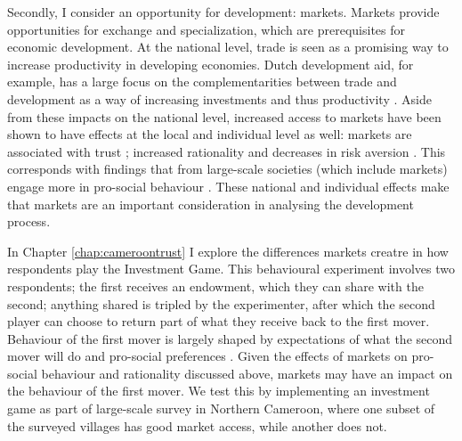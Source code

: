 Secondly, I consider an opportunity for development: markets. Markets provide opportunities for exchange and specialization, which are prerequisites for economic development. At the national level, trade is seen as a promising way to increase productivity in developing economies. Dutch development aid, for example, has a large focus on the complementarities between trade and development as a way of increasing investments and thus productivity \citep[see e.g.][]{Zoomers2014}. Aside from these impacts on the national level, increased access to markets have been shown to have effects at the local and individual level as well: markets are associated with trust \citep{Tu2010,Fischer2008}; increased rationality \citep{List2008,Cecchi2013,Braga2009} and decreases in risk aversion \citep{Melesse2015}. This corresponds with findings that from large-scale societies (which include markets) engage more in pro-social behaviour \cite{Henrich2005,Henrich2010}. These national and individual effects make that markets are an important consideration in analysing the development process. 

In Chapter \ref{chap:cameroontrust} I explore the differences markets creatre in how respondents play the Investment Game. This behavioural experiment involves two respondents; the first receives an endowment, which they can share with the second; anything shared is tripled by the experimenter, after which the second player can choose to return part of what they receive back to the first mover. Behaviour of the first mover is largely shaped by expectations of what the second mover will do and pro-social preferences \citep{Berg1995,Ashraf2006,Roth1995,Sapienza2013}. Given the effects of markets on pro-social behaviour and rationality discussed above, markets may have an impact on the behaviour of the first mover. We test this by implementing an investment game as part of large-scale survey in Northern Cameroon, where one subset of the surveyed villages has good market access, while another does not.

